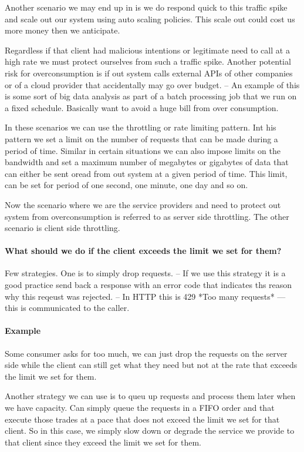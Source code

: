 Another scenario we may end up in is we do respond quick to this traffic spike and scale out our system using auto scaling policies.
This scale out could cost us more money then we anticipate.

Regardless if that client had malicious intentions or legitimate need to call at a high rate we must protect ourselves from such a traffic spike.
Another potential risk for overconsumption is if out system calls external APIs of other companies or of a cloud provider that accidentally may go over budget.
-- An example of this is some sort of big data analysis as part of a batch processing job that we run on a fixed schedule.
Basically want to avoid a huge bill from over consumption.

In these scenarios we can use the throttling or rate limiting pattern.
Int his pattern we set a limit on the number of requests that can be made during a period of time.
Similar in certain situations we can also impose limits on the bandwidth and set a maximum number of megabytes or gigabytes of data that can either be sent oread from out system at a given period of time.
This limit, can be set for period of one second, one minute, one day and so on.

Now the scenario where we are the service providers and need to protect out system from overconsumption is referred to as server side throttling.
The other scenario is client side throttling.

\paragraph{What should we do if the client exceeds the limit we set for them?}
Few strategies.
One is to simply drop requests.
-- If we use this strategy it is a good practice send back a response with an error code that indicates ths reason why this reqeust was rejected.
-- In HTTP this is 429 *Too many requests* --- this is communicated to the caller.

\paragraph{Example}
Some consumer asks for too much, we can just drop the requests on the server side while the client can still get what they need but not at the rate that exceeds the limit we set for them.

Another strategy we can use is to queu up requests and process them later when we have capacity.
Can simply queue the requests in a FIFO order and that execute those trades at a pace that does not exceed the limit we set for that client.
So in this case, we simply slow down or degrade the service we provide to that client since they exceed the limit we set for them.

